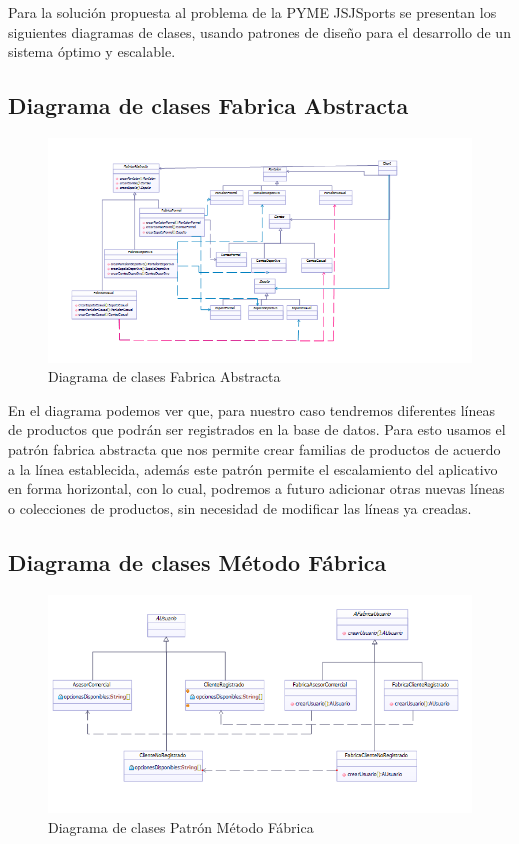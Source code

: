 Para la solución propuesta al problema de la PYME JSJSports se presentan los siguientes diagramas de clases, usando patrones de diseño para el desarrollo de un sistema óptimo y escalable.

\subsection*{Diagrama de clases Fabrica Abstracta}

\begin{figure}[th!]
	\centering
	\includegraphics[width=1\linewidth]{arquitectura/imagenes/DiagramaFabricaAbstracta}
	\caption{Diagrama de clases Fabrica Abstracta}
\end{figure}

En el diagrama podemos ver que, para nuestro caso tendremos diferentes líneas de productos que podrán ser registrados en la base de datos. Para esto usamos el patrón fabrica abstracta que nos permite crear familias de productos de acuerdo a la línea establecida, además este patrón permite el escalamiento del aplicativo en forma horizontal, con lo cual, podremos a futuro adicionar otras nuevas líneas o colecciones de productos, sin necesidad de modificar las líneas ya creadas.

\subsection*{Diagrama de clases Método Fábrica}
\begin{figure}[th!]
	\centering
	\includegraphics[width=0.7\linewidth]{arquitectura/imagenes/DiagramaMetodoFabrica}
	\caption{Diagrama de clases Patrón Método Fábrica}
\end{figure}

